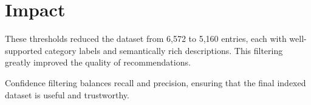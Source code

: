 \section*{Impact}
These thresholds reduced the dataset from 6,572 to 5,160 entries, each with well-supported category labels and semantically rich descriptions. This filtering greatly improved the quality of recommendations.

Confidence filtering balances recall and precision, ensuring that the final indexed dataset is useful and trustworthy.
